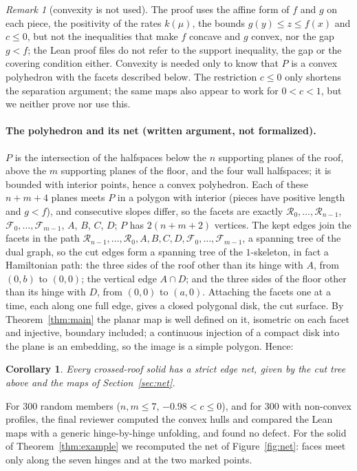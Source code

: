 \documentclass[11pt]{article}
\newtheorem{corollary}{Corollary}
\theoremstyle{definition}
\theoremstyle{remark}
\newtheorem{remark}{Remark}
\newcommand{\cR}{\mathcal R}
\newcommand{\cF}{\mathcal F}
\begin{document}
\begin{remark}[convexity is not used]\label{rem:convexity}
The proof uses the affine form of $f$ and $g$ on each piece, the positivity of
the rates $k(\mu)$, the bounds $g(y)\le z\le f(x)$ and $c\le0$, but not the
inequalities that make $f$ concave and $g$ convex, nor the gap $g<f$; the Lean
proof files do not refer to the support inequality, the gap or the covering
condition either. Convexity is needed only to know that $P$ is a convex
polyhedron with the facets described below. The restriction $c\le0$ only
shortens the separation argument; the same maps also appear to work for
$0<c<1$, but we neither prove nor use this.
\end{remark}

\paragraph{The polyhedron and its net (written argument, not formalized).}
$P$ is the intersection of the halfspaces below the $n$ supporting planes of
the roof, above the $m$ supporting planes of the floor, and the four wall
halfspaces; it is bounded with interior points, hence a convex polyhedron.
Each of these $n+m+4$ planes meets $P$ in a polygon with interior (pieces
have positive length and $g<f$), and consecutive slopes differ, so the facets
are exactly $\cR_0,\dots,\cR_{n-1}$, $\cF_0,\dots,\cF_{m-1}$, $A$, $B$, $C$,
$D$; $P$ has $2(n+m+2)$ vertices. The kept edges join the facets in the path
$\cR_{n-1},\dots,\cR_0,A,B,C,D,\cF_0,\dots,\cF_{m-1}$, a spanning tree of the
dual graph, so the cut edges form a spanning tree of the $1$-skeleton, in fact
a Hamiltonian path: the three sides of the roof other than its hinge with $A$,
from $(0,b)$ to $(0,0)$; the vertical edge $A\cap D$; and the three sides of
the floor other than its hinge with $D$, from $(0,0)$ to $(a,0)$. Attaching
the facets one at a time, each along one full edge, gives a closed polygonal
disk, the cut surface. By Theorem~\ref{thm:main} the planar map is well
defined on it, isometric on each facet and injective, boundary included; a
continuous injection of a compact disk into the plane is an embedding, so the
image is a simple polygon. Hence:

\begin{corollary}\label{cor:net}
Every crossed-roof solid has a strict edge net, given by the cut tree above
and the maps of Section~\ref{sec:net}.
\end{corollary}

\noindent For $300$ random members ($n,m\le7$, $-0.98<c\le0$), and for $300$
with non-convex profiles, the final reviewer computed the convex hulls and
compared the Lean maps with a generic hinge-by-hinge unfolding, and found no
defect. For the solid of Theorem~\ref{thm:example} we recomputed the net of
Figure~\ref{fig:net}: faces meet only along the seven hinges and at the two
marked points.
\end{document}
